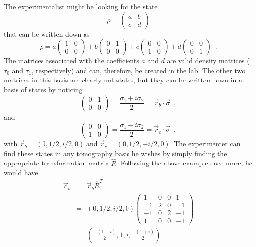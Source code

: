 \begin{example}
The experimentalist might be looking for the state
$$
\rho = \begin{pmatrix}
a & b\\
c & d
\end{pmatrix}
$$
that can be written down as
$$
\rho = a\begin{pmatrix}
1 & 0\\
0 & 0
\end{pmatrix}+b\begin{pmatrix}
0 & 1\\
0 & 0
\end{pmatrix}+c\begin{pmatrix}
0 & 0\\
1 & 0
\end{pmatrix}+d\begin{pmatrix}
0 & 0\\
0 & 1
\end{pmatrix}\;\;.
$$
The matrices associated with the coefficients $a$ and $d$ are valid density matrices ($\tau_0$ and $\tau_1$, respectively) and can, therefore, be created in the lab.  The other two matrices in this basis are clearly not states, but they can be written down in a basis of states by noticing
$$
\begin{pmatrix}
0 & 1\\
0 & 0
\end{pmatrix} = \frac{\sigma_1+i\sigma_2}{2} = \vec{r}_b\cdot\vec{\sigma}\;\;,
$$
and
$$
\begin{pmatrix}
0 & 0\\
1 & 0
\end{pmatrix} = \frac{\sigma_1-i\sigma_2}{2} = \vec{r}_c\cdot\vec{\sigma}\;\;,
$$
with $\vec{r}_b = (0,1/2,i/2,0)$ and $\vec{r}_c = (0,1/2,-i/2,0)$.  The experimenter can find these states in any tomography basis he wishes by simply finding the appropriate transformation matrix $\hat{R}$.  Following the above example once more, he would have
\begin{eqnarray*}
\vec{c}_b &=& \vec{r}_b\hat{R}^T \\
&=& (0,1/2,i/2,0)\begin{pmatrix}
1 & 0 & 0 & 1\\
-1 & 2 & 0 & -1\\
-1 & 0 & 2 & -1\\
1 & 0 & 0 & -1
\end{pmatrix}\\
&=& \left(\frac{-(1+i)}{2},1,i,\frac{-(1+i)}{2}\right)
\end{eqnarray*}

\end{example}
